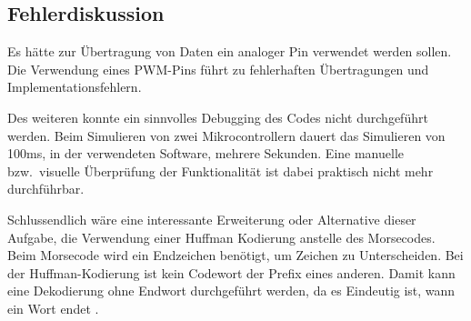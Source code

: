 \subsection{Fehlerdiskussion}
\label{subsec:a7-fehlerdiskussion}

Es hätte zur Übertragung von Daten ein analoger Pin verwendet werden sollen.
Die Verwendung eines PWM-Pins führt zu fehlerhaften Übertragungen und Implementationsfehlern.

Des weiteren konnte ein sinnvolles Debugging des Codes nicht durchgeführt werden.
Beim Simulieren von zwei Mikrocontrollern dauert das Simulieren von 100ms, in der verwendeten Software, mehrere Sekunden.
Eine manuelle bzw.\ visuelle Überprüfung der Funktionalität ist dabei praktisch nicht mehr durchführbar.

Schlussendlich wäre eine interessante Erweiterung oder Alternative dieser Aufgabe, die Verwendung einer Huffman Kodierung anstelle des Morsecodes.
Beim Morsecode wird ein Endzeichen benötigt, um Zeichen zu Unterscheiden.
Bei der Huffman-Kodierung ist kein Codewort der Prefix eines anderen.
Damit kann eine Dekodierung ohne Endwort durchgeführt werden, da es Eindeutig ist, wann ein Wort endet \cite{huffman}.
